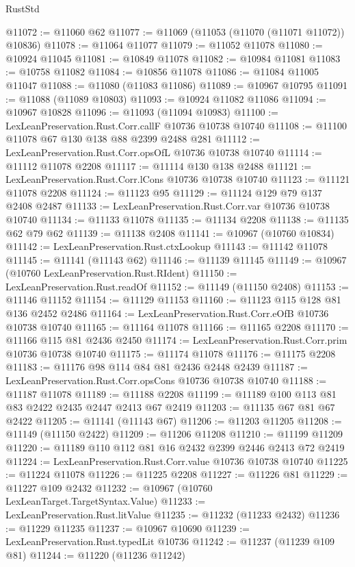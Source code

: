 \begin{lexlean}{RustStd}
\begin{coremodule}
@11072 := @11060 @62
@11077 := @11069 (@11053 (@11070 (@11071 @11072)) @10836)
@11078 := @11064 @11077
@11079 := @11052 @11078
@11080 := @10924 @11045
@11081 := @10849 @11078
@11082 := @10984 @11081
@11083 := @10758 @11082
@11084 := @10856 @11078
@11086 := @11084 @11005 @11047
@11088 := @11080 (@11083 @11086)
@11089 := @10967 @10795
@11091 := @11088 (@11089 @10803)
@11093 := @10924 @11082 @11086
@11094 := @10967 @10828
@11096 := @11093 (@11094 @10983)
@11100 := LexLeanPreservation.Rust.Corr.callF @10736 @10738 @10740
@11108 := @11100 @11078 @67 @130 @138 @88 @2399 @2488 @281
@11112 := LexLeanPreservation.Rust.Corr.opsOfL @10736 @10738 @10740
@11114 := @11112 @11078 @2208
@11117 := @11114 @130 @138 @2488
@11121 := LexLeanPreservation.Rust.Corr.lCons @10736 @10738 @10740
@11123 := @11121 @11078 @2208
@11124 := @11123 @95
@11129 := @11124 @129 @79 @137 @2408 @2487
@11133 := LexLeanPreservation.Rust.Corr.var @10736 @10738 @10740
@11134 := @11133 @11078
@11135 := @11134 @2208
@11138 := @11135 @62 @79 @62
@11139 := @11138 @2408
@11141 := @10967 (@10760 @10834)
@11142 := LexLeanPreservation.Rust.ctxLookup
@11143 := @11142 @11078
@11145 := @11141 (@11143 @62)
@11146 := @11139 @11145
@11149 := @10967 (@10760 LexLeanPreservation.Rust.RIdent)
@11150 := LexLeanPreservation.Rust.readOf
@11152 := @11149 (@11150 @2408)
@11153 := @11146 @11152
@11154 := @11129 @11153
@11160 := @11123 @115 @128 @81 @136 @2452 @2486
@11164 := LexLeanPreservation.Rust.Corr.eOfB @10736 @10738 @10740
@11165 := @11164 @11078
@11166 := @11165 @2208
@11170 := @11166 @115 @81 @2436 @2450
@11174 := LexLeanPreservation.Rust.Corr.prim @10736 @10738 @10740
@11175 := @11174 @11078
@11176 := @11175 @2208
@11183 := @11176 @98 @114 @84 @81 @2436 @2448 @2439
@11187 := LexLeanPreservation.Rust.Corr.opsCons @10736 @10738 @10740
@11188 := @11187 @11078
@11189 := @11188 @2208
@11199 := @11189 @100 @113 @81 @83 @2422 @2435 @2447 @2413 @67 @2419
@11203 := @11135 @67 @81 @67 @2422
@11205 := @11141 (@11143 @67)
@11206 := @11203 @11205
@11208 := @11149 (@11150 @2422)
@11209 := @11206 @11208
@11210 := @11199 @11209
@11220 := @11189 @110 @112 @81 @16 @2432 @2399 @2446 @2413 @72 @2419
@11224 := LexLeanPreservation.Rust.Corr.value @10736 @10738 @10740
@11225 := @11224 @11078
@11226 := @11225 @2208
@11227 := @11226 @81
@11229 := @11227 @109 @2432
@11232 := @10967 (@10760 LexLeanTarget.TargetSyntax.Value)
@11233 := LexLeanPreservation.Rust.litValue
@11235 := @11232 (@11233 @2432)
@11236 := @11229 @11235
@11237 := @10967 @10690
@11239 := LexLeanPreservation.Rust.typedLit @10736
@11242 := @11237 (@11239 @109 @81)
@11244 := @11220 (@11236 @11242)

\end{coremodule}
\end{lexlean}

